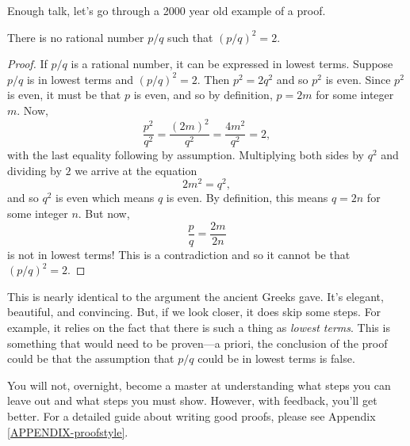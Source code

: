 	Enough talk, let's go through a 2000 year old example of a proof.
	\begin{theorem}
		There is no rational number $p/q$ such that $(p/q)^2=2$.
	\end{theorem}
	\begin{proof}
		If $p/q$ is a rational number, it can be expressed
		in lowest terms.
		Suppose $p/q$ is in lowest terms and $(p/q)^2=2$.  Then $p^2=2q^2$ and so $p^2$ is even.  Since
		$p^2$ is even, it must be that $p$ is even, and so by definition,
		$p=2m$ for some integer $m$.  Now,
		\[
			\frac{p^2}{q^2}=\frac{(2m)^2}{q^2}=\frac{4m^2}{q^2}=2,
		\]
		with the last equality following by assumption.  Multiplying both sides by $q^2$
		and dividing by $2$ we arrive at the equation
		\[
			2m^2=q^2,
		\]
		and so $q^2$ is even which means $q$ is even.  By definition, this means $q=2n$ for some integer $n$.
		But now,
		\[
			\frac{p}{q}=\frac{2m}{2n}
		\]
		is not in lowest terms!  This is a contradiction and so it cannot be that $(p/q)^2=2$.
	\end{proof}
	This is nearly identical to the argument the ancient Greeks gave.  It's elegant, beautiful,
	and convincing.  But, if we look closer, it does skip some steps.  For example, it relies on
	the fact that there is such a thing as \emph{lowest terms}.  This is something that would
	need to be proven---a priori, the conclusion of the proof could be that the assumption
	that $p/q$ could be in lowest terms is false.  
	
	You will not, overnight,
	become a master at understanding
	what steps you can leave out and what steps you must show.  However, with feedback,
	you'll get better.
	For a detailed guide about writing good proofs, please see Appendix \ref{APPENDIX-proofstyle}.

